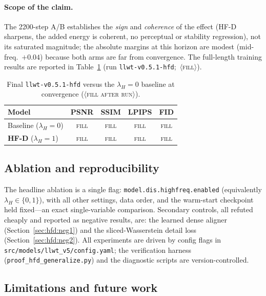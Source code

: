 \paragraph{Scope of the claim.} The \num{2200}-step A/B establishes the \emph{sign} and
\emph{coherence} of the effect (HF-D sharpens, the added energy is coherent, no perceptual or
stability regression), not its saturated magnitude; the absolute margins at this horizon are
modest (mid-freq.\ ${+}0.04$) because both arms are far from convergence. The full-length
training results are reported in Table~\ref{tab:hfd_final} (run
\texttt{llwt-v0.5.1-hfd}; \,$\langle$\textsc{fill}$\rangle$).

\begin{table}[t]
\centering
\caption{Final \texttt{llwt-v0.5.1-hfd} versus the $\lambda_H{=}0$ baseline at convergence
($\langle$\textsc{fill after run}$\rangle$).}
\label{tab:hfd_final}
\begin{tabular}{lcccc}
\toprule
Model & PSNR & SSIM & LPIPS & FID \\
\midrule
Baseline ($\lambda_H{=}0$)          & \textsc{fill} & \textsc{fill} & \textsc{fill} & \textsc{fill} \\
\textbf{HF-D} ($\lambda_H{=}1$)     & \textsc{fill} & \textsc{fill} & \textsc{fill} & \textsc{fill} \\
\bottomrule
\end{tabular}
\end{table}

\subsection{Ablation and reproducibility}
\label{sec:hfd:ablation}

The headline ablation is a single flag: \texttt{model.dis.highfreq.enabled} (equivalently
$\lambda_H \in \{0,1\}$), with all other settings, data order, and the warm-start checkpoint
held fixed---an exact single-variable comparison. Secondary controls, all refuted cheaply and
reported as negative results, are: the learned dense aligner (Section~\ref{sec:hfd:neg1}) and
the sliced-Wasserstein detail loss (Section~\ref{sec:hfd:neg2}). All experiments are driven by
config flags in \texttt{src/models/llwt\_v5/config.yaml}; the verification harness
(\texttt{proof\_hfd\_generalize.py}) and the diagnostic scripts are version-controlled.

\subsection{Limitations and future work}
\label{sec:hfd:limits}


